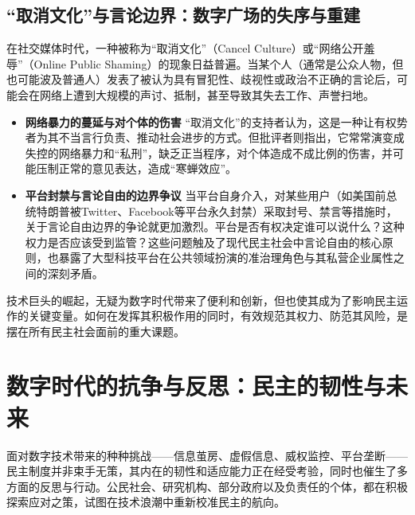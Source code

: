 \documentclass[UTF8, 10pt]{ctexbook}
\begin{document}
\subsection{“取消文化”与言论边界：数字广场的失序与重建}
在社交媒体时代，一种被称为“取消文化”（Cancel Culture）或“网络公开羞辱”（Online Public Shaming）的现象日益普遍。当某个人（通常是公众人物，但也可能波及普通人）发表了被认为具有冒犯性、歧视性或政治不正确的言论后，可能会在网络上遭到大规模的声讨、抵制，甚至导致其失去工作、声誉扫地。
\begin{itemize}
    \item \textbf{网络暴力的蔓延与对个体的伤害}
    “取消文化”的支持者认为，这是一种让有权势者为其不当言行负责、推动社会进步的方式。但批评者则指出，它常常演变成失控的网络暴力和“私刑”，缺乏正当程序，对个体造成不成比例的伤害，并可能压制正常的意见表达，造成“寒蝉效应”。

    \item \textbf{平台封禁与言论自由的边界争议}
    当平台自身介入，对某些用户（如美国前总统特朗普被Twitter、Facebook等平台永久封禁）采取封号、禁言等措施时，关于言论自由边界的争论就更加激烈。平台是否有权决定谁可以说什么？这种权力是否应该受到监管？这些问题触及了现代民主社会中言论自由的核心原则，也暴露了大型科技平台在公共领域扮演的准治理角色与其私营企业属性之间的深刻矛盾。
\end{itemize}
技术巨头的崛起，无疑为数字时代带来了便利和创新，但也使其成为了影响民主运作的关键变量。如何在发挥其积极作用的同时，有效规范其权力、防范其风险，是摆在所有民主社会面前的重大课题。

\section{数字时代的抗争与反思：民主的韧性与未来}
\lettrine[lines=2]{面}{对}数字技术带来的种种挑战——信息茧房、虚假信息、威权监控、平台垄断——民主制度并非束手无策，其内在的韧性和适应能力正在经受考验，同时也催生了多方面的反思与行动。公民社会、研究机构、部分政府以及负责任的个体，都在积极探索应对之策，试图在技术浪潮中重新校准民主的航向。
\end{document}
